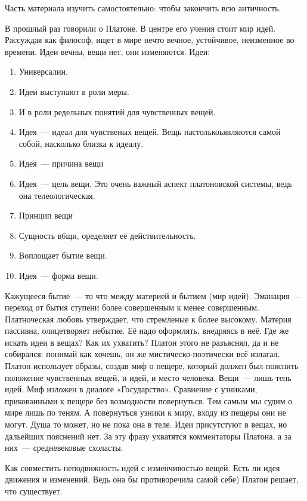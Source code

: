 
Часть материала изучить самостоятельно: чтобы закончить всю античность. 

В прошлый раз говорили о Платоне. В центре его учения стоит мир идей. Рассуждая как философ, ищет в мире нечто вечное, устойчивое, неизменное во времени. 
Идеи вечны, вещи нет, они изменяются. 
Идеи:

\begin{enumerate}
	\item Универсалии. 
	\item Идеи выступают в роли меры. 
	\item И в роли редельных понятий для чувственных вещей. 
	\item Идея~--- идеал для чувственых вещей. Вещь настолькоьявляются самой собой, насколько близка к идеалу. 
	\item Идея~--- причина вещи
	\item Идея~--- цель вещи. Это очень важный аспект платоновской системы, ведь она телеологическая. 
	\item Принцип вещи
	\item Сущность в6щи, оределяет её действительность. 
	\item Воплощает бытие вещи. 
	\item Идея~--- форма вещи. 
\end{enumerate}

Кажущееся бытие~--- то что между материей и бытием (мир идей). 
Эманация~--- переход от бытия ступени более совершенным к менее совершенным. 
Платноческая любовь утверждает, что стремленые к более высокому. 
Материя пассивна, олицетворяет небытие. Её надо оформлять, внедряясь в неё. 
Где же искать идеи в вещах? Как их ухватить?
Платон этого не разъяснял, да и не собирался: понимай как хочешь, он же мистическо-поэтически всё излагал. Платон использует образы, создав миф о пещере, который должен был пояснить положение чувственных вещей, и идей, и место человека. 
Вещи~--- лишь тень идей. Миф изложен в диалоге «Государство». Сравнение с узниками, прикованными к пещере без возмодности повернуться. Тем самым мы судим о мире лишь по теням. 
А повернуться узники к миру, входу из пещеры они не могут. Душа то может, но не пока она в теле. 
Идеи присутстуют в вещах, но дальейших пояснений нет. За эту фразу ухватятся комментаторы Платона, а за них~--- средневековые схоласты. 

Как совместить неподвижность идей с изменчивостью вещей. Есть ли идея движения и изменений. Ведь она бы противоречила самой себе) Платон решает, что существует. 

